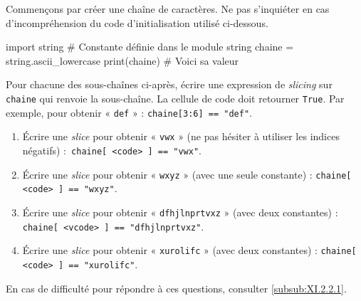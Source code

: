 \begin{exercise}[title={Séquences et {\itshape slicing}}, level=basic]
Commençons par créer une chaîne de caractères. Ne pas s'inquiéter en cas d'incompréhension du code d'initialisation utilisé ci-dessous. 


\begin{idleconsole}
\begin{pyconsole}
import string # Constante définie dans le module string
chaine = string.ascii_lowercase
print(chaine) # Voici sa valeur
\end{pyconsole}
\end{idleconsole}

Pour chacune des sous-chaînes ci-après, écrire une expression de \textit{slicing} sur \texttt{chaine} qui renvoie la sous-chaîne. La cellule de code doit retourner \texttt{True}. Par exemple, pour obtenir « \texttt{def} » : \texttt{chaine[3:6] == "def"}.
\begin{enumerate}
\item Écrire une \textit{slice} pour obtenir « \texttt{vwx} » (ne pas hésiter à utiliser les indices négatifs) :\texttt{ chaine[ <code> ] == "vwx"}.
\item Écrire une \textit{slice} pour obtenir « \texttt{wxyz} » (avec une seule constante) : \texttt{chaine[ <code> ] == "wxyz"}.
\item Écrire une \textit{slice} pour obtenir « \texttt{dfhjlnprtvxz} » (avec deux constantes) : \texttt{chaine[ <vcode> ] == "dfhjlnprtvxz"}.
\item Écrire une \textit{slice} pour obtenir « \texttt{xurolifc} » (avec deux constantes) : \texttt{chaine[ <code> ] == "xurolifc"}.
\end{enumerate}

En cas de difficulté pour répondre à ces questions, consulter \cref{subsub:XI.2.2.1}.
\end{exercise}

